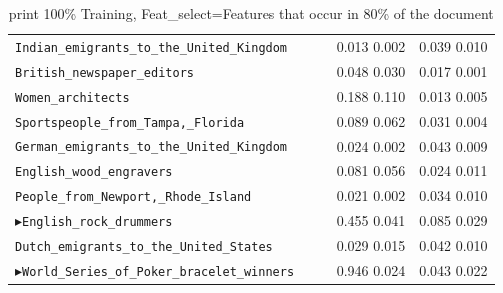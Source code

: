 \documentclass{article}
\renewcommand{\bullet}[0]{$\blacktriangleright$}
\begin{document}
\begin{table}[htbp]
  \centering
  \begin{tabular}{l | c  | c }\toprule
\verb|Indian_emigrants_to_the_United_Kingdom    |          & 0.013 0.002 & 0.039 0.010 \\
\verb|British_newspaper_editors                 |          & 0.048 0.030 & 0.017 0.001 \\
\verb|Women_architects                          |          & 0.188 0.110 & 0.013 0.005 \\
\verb|Sportspeople_from_Tampa,_Florida          |          & 0.089 0.062 & 0.031 0.004 \\
\verb|German_emigrants_to_the_United_Kingdom    |          & 0.024 0.002 & 0.043 0.009 \\
\verb|English_wood_engravers                    |          & 0.081 0.056 & 0.024 0.011 \\
\verb|People_from_Newport,_Rhode_Island         |          & 0.021 0.002 & 0.034 0.010 \\
\bullet{\verb|English_rock_drummers             |}         & 0.455 0.041 & 0.085 0.029 \\
\verb|Dutch_emigrants_to_the_United_States      |          & 0.029 0.015 & 0.042 0.010 \\
\bullet{\verb|World_Series_of_Poker_bracelet_winners    |} & 0.946 0.024 & 0.043 0.022 \\
\bottomrule\end{tabular}
  \caption{print 100\% Training, Feat\_select=Features that occur in 80\% of the document}
  \label{tab:feat-select-doc-80}
\end{table}
\end{document}
